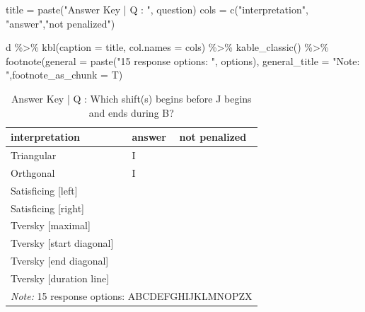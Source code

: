\documentclass[
  letterpaper,
  DIV=11,
  numbers=noendperiod]{scrreprt}
\newenvironment{Shaded}{\begin{snugshade}}{\end{snugshade}}
\newcommand{\AttributeTok}[1]{\textcolor[rgb]{0.40,0.45,0.13}{#1}}
\newcommand{\FunctionTok}[1]{\textcolor[rgb]{0.28,0.35,0.67}{#1}}
\newcommand{\NormalTok}[1]{\textcolor[rgb]{0.00,0.23,0.31}{#1}}
\newcommand{\OtherTok}[1]{\textcolor[rgb]{0.00,0.23,0.31}{#1}}
\newcommand{\SpecialCharTok}[1]{\textcolor[rgb]{0.37,0.37,0.37}{#1}}
\newcommand{\StringTok}[1]{\textcolor[rgb]{0.13,0.47,0.30}{#1}}
\begin{document}
\begin{Shaded}
\begin{Highlighting}[]
\NormalTok{title }\OtherTok{=} \FunctionTok{paste}\NormalTok{(}\StringTok{"Answer Key | Q : "}\NormalTok{, question)}
\NormalTok{cols }\OtherTok{=} \FunctionTok{c}\NormalTok{(}\StringTok{"interpretation"}\NormalTok{, }\StringTok{"answer"}\NormalTok{,}\StringTok{"not penalized"}\NormalTok{)}

\NormalTok{d }\SpecialCharTok{\%\textgreater{}\%} \FunctionTok{kbl}\NormalTok{(}\AttributeTok{caption =}\NormalTok{ title, }\AttributeTok{col.names =}\NormalTok{ cols) }\SpecialCharTok{\%\textgreater{}\%} \FunctionTok{kable\_classic}\NormalTok{() }\SpecialCharTok{\%\textgreater{}\%}
  \FunctionTok{footnote}\NormalTok{(}\AttributeTok{general =} \FunctionTok{paste}\NormalTok{(}\StringTok{"15 response options: "}\NormalTok{, options), }\AttributeTok{general\_title =} \StringTok{"Note: "}\NormalTok{,}\AttributeTok{footnote\_as\_chunk =}\NormalTok{ T)}
\end{Highlighting}
\end{Shaded}

\begin{table}

\caption{Answer Key | Q :  Which shift(s) begins before J begins and ends during B?}
\centering
\begin{tabular}[t]{l|l|l}
\hline
interpretation & answer & not penalized\\
\hline
Triangular & I & \\
\hline
Orthgonal & I & \\
\hline
Satisficing [left] &  & \\
\hline
Satisficing [right] &  & \\
\hline
Tversky [maximal] &  & \\
\hline
Tversky [start diagonal] &  & \\
\hline
Tversky [end diagonal] &  & \\
\hline
Tversky [duration line] &  & \\
\hline
\multicolumn{3}{l}{\rule{0pt}{1em}\textit{Note: } 15 response options:  ABCDEFGHIJKLMNOPZX}\\
\end{tabular}
\end{table}
\end{document}
